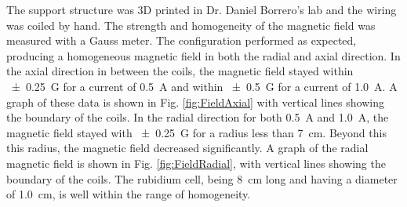 The support structure was 3D printed in Dr. Daniel Borrero's lab and the wiring was coiled by hand. The strength and homogeneity of the magnetic field was measured with a Gauss meter. The configuration performed as expected, producing a homogeneous magnetic field in both the radial and axial direction. In the axial direction in between the coils, the magnetic field stayed within \SI{\pm 0.25}{ G} for a current of \SI{0.5}{ A} and within \SI{\pm 0.5}{ G} for a current of \SI{1.0}{ A}. A graph of these data is shown in Fig. \ref{fig:FieldAxial} with vertical lines showing the boundary of the coils. In the radial direction for both \SI{0.5}{ A} and \SI{1.0}{ A}, the magnetic field stayed with \SI{\pm 0.25}{ G} for a radius less than \SI{7}{\centi \meter}. Beyond this this radius, the magnetic field decreased significantly. A graph of the radial magnetic field is shown in Fig. \ref{fig:FieldRadial}, with vertical lines showing the boundary of the coils. The rubidium cell, being \SI{8}{\centi \meter} long and having a diameter of \SI{1.0}{\centi \meter}, is well within the range of homogeneity.



